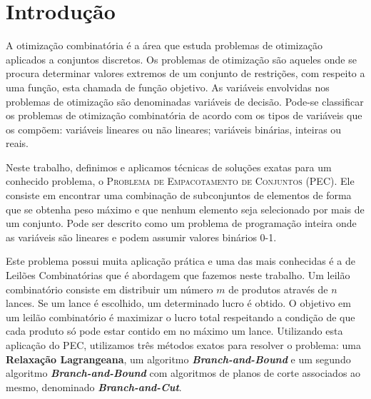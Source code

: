 \documentclass{article}
\begin{document}
	
	\section{Introdução}
	A otimização combinatória é a área que estuda problemas de otimização aplicados a conjuntos discretos. Os problemas de otimização são aqueles onde se procura determinar valores extremos de um conjunto de restrições, com respeito a uma função, esta chamada de função objetivo. As variáveis envolvidas nos problemas de otimização são denominadas variáveis de decisão. Pode-se classificar os problemas de otimização combinatória de acordo com os tipos de variáveis que os compõem: variáveis lineares ou não lineares; variáveis binárias, inteiras ou reais.
	
	Neste trabalho, definimos e aplicamos técnicas de soluções exatas para um conhecido problema, o \textsc{Problema de Empacotamento de Conjuntos (PEC)}.
	Ele consiste em encontrar uma combinação de subconjuntos de elementos de forma que se obtenha peso máximo e que nenhum elemento seja selecionado por mais de um conjunto. Pode ser descrito como um problema de programação inteira onde as variáveis são lineares e podem assumir valores binários 0-1.
	
	Este problema possui muita aplicação prática e uma das mais conhecidas é a de Leilões Combinatórias que é abordagem que fazemos neste trabalho. Um leilão combinatório consiste em distribuir um número $m$ de produtos através de $n$ lances. Se um lance é escolhido, um determinado lucro é obtido. O objetivo em um leilão combinatório é maximizar o lucro total respeitando a condição de que cada produto só pode estar contido em no máximo um lance. Utilizando esta aplicação do PEC, utilizamos três métodos exatos para resolver o problema: uma \textbf{Relaxação Lagrangeana}, um algoritmo \emph{\textbf{Branch-and-Bound}} e um segundo algoritmo \emph{\textbf{Branch-and-Bound}} com algoritmos de planos de corte associados ao mesmo, denominado \emph{\textbf{Branch-and-Cut}}.
	
\end{document}
